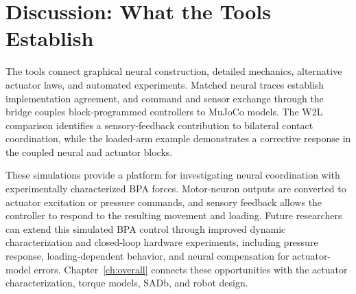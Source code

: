 \section{Discussion: What the Tools Establish}\label{sec:sns_discussion}

The tools connect graphical neural construction, detailed mechanics, alternative actuator laws, and automated experiments. Matched neural traces establish implementation agreement, and command and sensor exchange through the bridge couples block-programmed controllers to MuJoCo models. The W2L comparison identifies a sensory-feedback contribution to bilateral contact coordination, while the loaded-arm example demonstrates a corrective response in the coupled neural and actuator blocks.

These simulations provide a platform for investigating neural coordination with experimentally characterized BPA forces. Motor-neuron outputs are converted to actuator excitation or pressure commands, and sensory feedback allows the controller to respond to the resulting movement and loading. Future researchers can extend this simulated BPA control through improved dynamic characterization and closed-loop hardware experiments, including pressure response, loading-dependent behavior, and neural compensation for actuator-model errors. Chapter~\ref{ch:overall} connects these opportunities with the actuator characterization, torque models, SADb, and robot design.
